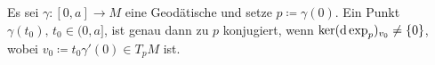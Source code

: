 Es sei $\gamma\colon [0,a]\to M$ eine Geodätische \pause und setze $p\coloneqq\gamma(0)$. \pause Ein Punkt $\gamma(t_0), \,t_0\in(0,a]$, \pause ist genau dann zu $p$ konjugiert, \pause wenn $\ker (\mathrm{d} \exp_p)_{v_0} \neq \{0\}$, \pause wobei $v_0\coloneqq t_0\gamma'(0) \in T_p M$ ist. 